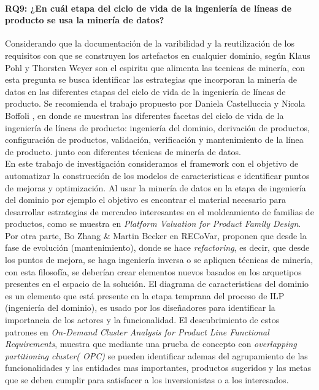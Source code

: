 \paragraph{RQ9: ¿En cuál etapa del ciclo de vida de la ingeniería de líneas de producto se usa la minería de datos?}
  Considerando que la documentación de la varibilidad y la reutilización de los requisitos con que se construyen los artefactos en cualquier dominio, según Klaus Pohl y Thorsten Weyer\cite{Pohl2005} son el espiritu que alimenta las tecnicas de minería, con esta pregunta se busca identificar las estrategias que incorporan la minería de datos en las diferentes etapas del ciclo de vida de la ingeniería de líneas de producto. Se recomienda el trabajo propuesto por Daniela Castelluccia y Nicola Boffoli \cite{Castelluccia2014}, en donde se muestran las diferentes facetas del ciclo de vida de la ingeniería de líneas de producto: ingeniería del dominio, derivación de productos, configuración de productos, validación, verificación y mantenimiento de la línea de producto. junto con diferentes técnicas de minería de datos. \\
   En este trabajo de investigación consideramos el framework\cite{Pohl2005} con el objetivo de automatizar la construcción de los modelos de caracteristicas e identificar puntos de mejoras y optimización. 
   Al usar la minería de datos  en la etapa de ingeniería del dominio por ejemplo\cite{PeterJ.Olver2013} el objetivo es encontrar el material necesario para desarrollar estrategias de mercadeo interesantes en el moldeamiento de familias de productos, como se muestra en \textit{Platform Valuation for Product Family Design}\cite{Simpson}.
  Por otra parte,  Bo Zhang \& Martin Becker en RECoVar\cite{Zhang2013}, proponen que desde la fase de evolución (mantenimiento), donde se hace \textit{refactoring}, es decir, que desde los puntos de mejora, se haga ingeniería inversa o se apliquen técnicas de minería, con esta filosofía, se deberían crear elementos nuevos basados en los arquetipos presentes en el espacio de la solución.
  El diagrama de caracteristicas del dominio es un elemento que está presente en la etapa temprana del proceso de ILP (ingeniería del dominio), es usado por los diseñadores para identificar la importancia de los actores y la funcionalidad. El descubrimiento de estos patrones en \textit{On-Demand Cluster Analysis for Product Line Functional Requirements}\cite{Niu2008}, muestra que mediante una prueba de concepto con \textit{overlapping partitioning cluster( OPC)} se pueden identificar ademas del agrupamiento de las funcionalidades y las entidades mas importantes, productos sugeridos y las metas que se deben cumplir para satisfacer a los inversionistas o a los interesados. \\
